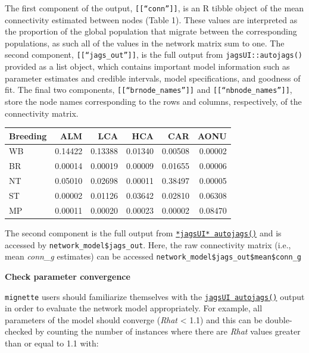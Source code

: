 \documentclass[
]{book}
\newenvironment{Shaded}{\begin{snugshade}}{\end{snugshade}}
\newcommand{\NormalTok}[1]{#1}
\newcommand{\SpecialCharTok}[1]{\textcolor[rgb]{0.81,0.36,0.00}{\textbf{#1}}}
\begin{document}
The first component of the output, \texttt{{[}{[}“conn”{]}{]}}, is an R tibble object of the mean connectivity estimated between nodes (Table 1). These values are interpreted as the proportion of the global population that migrate between the corresponding populations, as such all of the values in the network matrix sum to one. The second component, \texttt{{[}{[}“jags\_out”{]}{]}}, is the full output from \texttt{jagsUI::autojags()} provided as a list object, which contains important model information such as parameter estimates and credible intervals, model specifications, and goodness of fit. The final two components, \texttt{{[}{[}“brnode\_names”{]}{]}} and \texttt{{[}{[}“nbnode\_names”{]}{]}}, store the node names corresponding to the rows and columns, respectively, of the connectivity matrix.

\begin{Shaded}
\end{Shaded}

\begin{tabular}{l|r|r|r|r|r}
\hline
Breeding & ALM & LCA & HCA & CAR & AONU\\
\hline
WB & 0.14422 & 0.13388 & 0.01340 & 0.00508 & 0.00002\\
\hline
BR & 0.00014 & 0.00019 & 0.00009 & 0.01655 & 0.00006\\
\hline
NT & 0.05010 & 0.02698 & 0.00011 & 0.38497 & 0.00005\\
\hline
ST & 0.00002 & 0.01126 & 0.03642 & 0.02810 & 0.06308\\
\hline
MP & 0.00011 & 0.00020 & 0.00023 & 0.00002 & 0.08470\\
\hline
\end{tabular}

The second component is the full output from \href{https://rdrr.io/cran/jagsUI/man/autojags.html}{\texttt{*jagsUI*\ autojags()}} and is accessed by \texttt{network\_model\$jags\_out}. Here, the raw connectivity matrix (i.e., mean \emph{conn\_g} estimates) can be accessed \texttt{network\_model\$jags\_out\$mean\$conn\_g}

\textbf{Check parameter convergence}

\texttt{mignette} users should familiarize themselves with the \href{https://rdrr.io/cran/jagsUI/man/autojags.html}{\texttt{jagsUI\ autojags()}} output in order to evaluate the network model appropriately. For example, all parameters of the model should converge (\emph{Rhat} \textless{} 1.1) and this can be double-checked by counting the number of instances where there are \emph{Rhat} values greater than or equal to 1.1 with:
\end{document}
